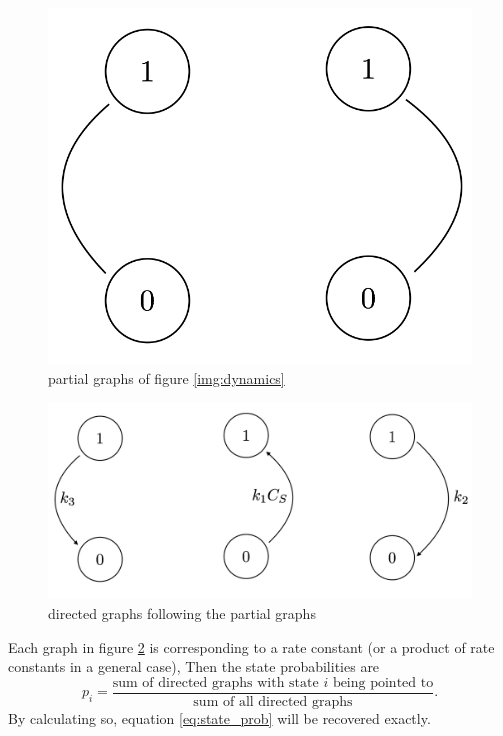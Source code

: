 		\begin{figure}[H]
		\centering
		\includegraphics[scale=0.3]{img/partial_graph.png}
		\caption{partial graphs of figure \ref{img:dynamics}}
		\label{img:partial_graphs}
		\end{figure}
		\begin{figure}[H]
		\centering
		\includegraphics[scale=0.3]{img/tree_graph.png}
		\caption{directed graphs following the partial graphs}
		\label{img:tree_graphs}
		\end{figure}
		\noindent Each graph in figure \ref{img:tree_graphs} is corresponding to a rate constant (or a product of rate constants in a general case), Then the state probabilities are
		\begin{equation}
			p_i = \frac{ \text{sum of directed graphs with state $i$ being pointed to} }{ \text{sum of all directed graphs} }.
		\end{equation}
		By calculating so, equation \eqref{eq:state_prob} will be recovered exactly.

